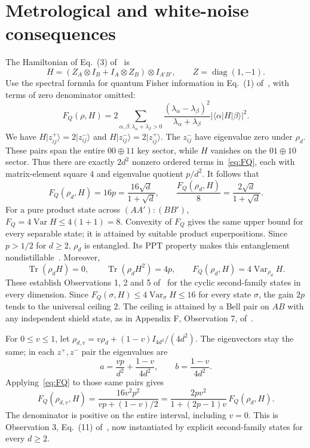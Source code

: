 \documentclass[11pt]{article}
\newcommand{\ket}[1]{\lvert #1\rangle}
\newcommand{\bra}[1]{\langle #1\rvert}
\newcommand{\Tr}{\operatorname{Tr}}
\begin{document}
\section{Metrological and white-noise consequences}

The Hamiltonian of Eq.\ (3) of~\cite{Pal2021} is
\[
 H=(Z_A\otimes I_B+I_A\otimes Z_B)\otimes I_{A'B'},
 \qquad Z=\operatorname{diag}(1,-1).
\]
Use the spectral formula for quantum Fisher information in Eq.\ (1)
of~\cite{Pal2021},
with terms of zero denominator omitted:
\begin{equation}\label{eq:FQ}
 F_Q(\rho,H)=2\sum_{\alpha,\beta:\lambda_\alpha+\lambda_\beta>0}
 \frac{(\lambda_\alpha-\lambda_\beta)^2}
 {\lambda_\alpha+\lambda_\beta}
 |\bra{\alpha}H\ket{\beta}|^2.
\end{equation}
We have $H\ket{z_{ij}^{+}}=2\ket{z_{ij}^{-}}$ and
$H\ket{z_{ij}^{-}}=2\ket{z_{ij}^{+}}$.
The $z^-_{ij}$ have eigenvalue zero under $\rho_d$.
These pairs span the entire $00\oplus11$ key sector, while $H$ vanishes
on the $01\oplus10$ sector. Thus there are exactly $2d^2$ nonzero
ordered terms in~\eqref{eq:FQ}, each with matrix-element square $4$ and
eigenvalue quotient $p/d^2$. It follows that
\begin{equation}\label{eq:gain}
 F_Q(\rho_d,H)=16p=\frac{16\sqrt d}{1+\sqrt d},\qquad
 \frac{F_Q(\rho_d,H)}8=\frac{2\sqrt d}{1+\sqrt d}.
\end{equation}
For a pure product state across $(AA'):(BB')$,
$F_Q=4\operatorname{Var}H\leq4(1+1)=8$.
Convexity of $F_Q$ gives the same upper bound for every separable state;
it is attained by suitable product superpositions.
Since $p>1/2$ for $d\geq2$, $\rho_d$ is entangled.
Its PPT property makes this entanglement nondistillable~\cite{Horodecki1998}.
Moreover,
\[
 \Tr(\rho_d H)=0,\qquad \Tr(\rho_d H^2)=4p,\qquad
 F_Q(\rho_d,H)=4\operatorname{Var}_{\rho_d}H.
\]
These establish Observations 1, 2 and 5 of~\cite{Pal2021} for the cyclic
second-family states in every dimension. Since
$F_Q(\sigma,H)\leq4\operatorname{Var}_\sigma H\leq16$ for every state
$\sigma$, the gain $2p$ tends to the universal ceiling $2$.
The ceiling is attained by a Bell pair on $AB$ with any independent shield
state, as in Appendix F, Observation 7, of~\cite{Pal2021}.

For $0\leq v\leq1$, let
$\rho_{d,v}=v\rho_d+(1-v)I_{4d^2}/(4d^2)$.
The eigenvectors stay the same; in each $z^+,z^-$ pair the eigenvalues are
\[
 a=\frac{vp}{d^2}+\frac{1-v}{4d^2},\qquad
 b=\frac{1-v}{4d^2}.
\]
Applying~\eqref{eq:FQ} to those same pairs gives
\begin{equation}\label{eq:noise}
 F_Q(\rho_{d,v},H)
 =\frac{16v^2p^2}{vp+(1-v)/2}
 =\frac{2pv^2}{1+(2p-1)v}\,F_Q(\rho_d,H).
\end{equation}
The denominator is positive on the entire interval, including $v=0$.
This is Observation 3, Eq.\ (11) of~\cite{Pal2021}, now instantiated
by explicit second-family states for every $d\geq2$.
\end{document}
